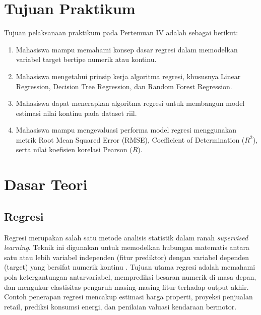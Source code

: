 \documentclass[a4paper,oneside,12pt]{report}
\begin{document}
\setcounter{page}{3}

\chapter[Tujuan Praktikum]{Tujuan Praktikum}
Tujuan pelaksanaan praktikum pada Pertemuan IV adalah sebagai berikut:
\begin{enumerate}
    \item Mahasiswa mampu memahami konsep dasar regresi dalam memodelkan variabel target bertipe numerik atau kontinu.
    \item Mahasiswa mengetahui prinsip kerja algoritma regresi, khususnya Linear Regression, Decision Tree Regression, dan Random Forest Regression.
    \item Mahasiswa dapat menerapkan algoritma regresi untuk membangun model estimasi nilai kontinu pada dataset riil.
    \item Mahasiswa mampu mengevaluasi performa model regresi menggunakan metrik Root Mean Squared Error (RMSE), Coefficient of Determination ($R^2$), serta nilai koefisien korelasi Pearson ($R$).
\end{enumerate}
\clearpage

\chapter{Dasar Teori}

\section{Regresi}
Regresi merupakan salah satu metode analisis statistik dalam ranah \textit{supervised learning}. Teknik ini digunakan untuk memodelkan hubungan matematis antara satu atau lebih variabel independen (fitur prediktor) dengan variabel dependen (target) yang bersifat numerik kontinu \cite{ref4}. Tujuan utama regresi adalah memahami pola ketergantungan antarvariabel, memprediksi besaran numerik di masa depan, dan mengukur elastisitas pengaruh masing-masing fitur terhadap output akhir. Contoh penerapan regresi mencakup estimasi harga properti, proyeksi penjualan retail, prediksi konsumsi energi, dan penilaian valuasi kendaraan bermotor.
\end{document}
